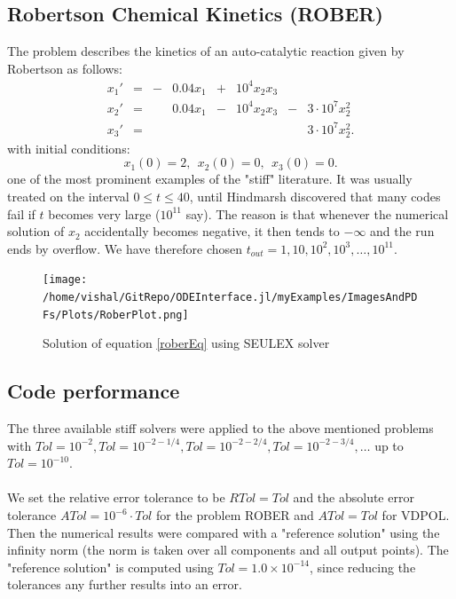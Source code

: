 \documentclass[notitlepage,12pt]{article}
\begin{document}
\subsection{Robertson Chemical Kinetics (ROBER)}
\label{sub:rober}
The problem describes the kinetics of an auto-catalytic reaction given by Robertson as follows:
\begin{equation}
\label{roberEq}
\begin{aligned}
x_1' &= &-&0.04x_1 &+ &10^4x_2x_3\\
x_2' &= & &0.04x_1 &- &10^4x_2x_3 &-&3\cdot 10^7x_2^2\\
x_3' &= & &        &  &           & &3\cdot 10^7x_2^2.
\end{aligned}
\end{equation}
with initial conditions:
\begin{equation}
x_1(0) = 2, \ \ x_2(0) = 0, \ \ x_3(0) = 0.
\end{equation}
one of the most prominent examples of the "stiff" literature. It was usually treated on the interval $0 \leq t \leq 40$, until Hindmarsh discovered that many codes fail if $t$ becomes very large ($10^{11}$ say). The reason is that whenever the numerical solution of $x_2$ accidentally becomes negative, it then tends to $-\infty$ and the run ends by overflow. We have therefore chosen $t_{out} = 1,10,10^2,10^3,\ldots,10^{11}$.

\begin{figure}[H]
\centering
\texttt{[image: /home/vishal/GitRepo/ODEInterface.jl/myExamples/ImagesAndPDFs/Plots/RoberPlot.png]}
\caption{Solution of equation \eqref{roberEq} using SEULEX solver}
\label{fig:roberPlot}
\end{figure}

\newpage

\subsection{Code performance}
\label{sec:codePerfStiff}

The three available stiff solvers were applied to the above mentioned problems with $Tol = 10^{-2} , Tol = 10^{-2-1/4} , Tol = 10^{-2-2/4}, Tol = 10^{-2-3/4},\ldots$ up to $Tol = 10^{-10}$.\\ \\
We set the relative error tolerance to be $RTol=Tol$ and the absolute error tolerance $ATol =10^{-6}\cdot Tol$ for the problem ROBER and $ATol = Tol$ for VDPOL. Then the numerical results were compared with a "reference solution" using the infinity norm (the norm is taken over all components and all output points). The "reference solution" is computed using $Tol=1.0\times 10^{-14}$, since reducing the tolerances any further results into an error.
\end{document}
